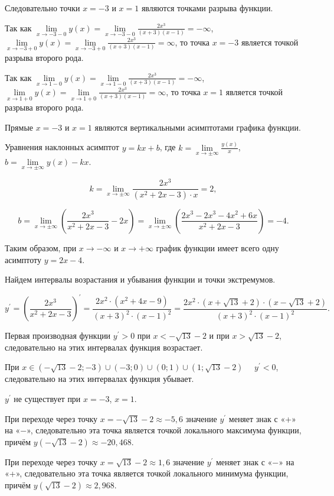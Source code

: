 \documentclass[fleqn]{article}
\begin{document}
Следовательно точки $x=-3$ и $x=1$ являются точками разрыва функции.

Так как $\lim\limits_{x\to-3-0}y(x)=\lim\limits_{x\to-3-0}\frac{2x^3}{(x+3)(x-1)}=-\infty$, $\lim\limits_{x\to-3+0}y(x)=\lim\limits_{x\to-3+0}\frac{2x^3}{(x+3)(x-1)}=\infty$, то точка $x=-3$ является точкой разрыва второго рода.

Так как $\lim\limits_{x\to1-0}y(x)=\lim\limits_{x\to1-0}\frac{2x^3}{(x+3)(x-1)}=-\infty$, $\lim\limits_{x\to1+0}y(x)=\lim\limits_{x\to1+0}\frac{2x^3}{(x+3)(x-1)}=\infty$, то точка $x=1$ является точкой разрыва второго рода.

Прямые $x=-3$ и $x=1$ являются вертикальными асимптотами графика функции.

Уравнения наклонных асимптот $y=kx+b$, где $k=\lim\limits_{x\to\pm\infty}\frac{y(x)}{x}$, $b=\lim\limits_{x\to\pm\infty}y(x)-kx$.

$$k=\lim\limits_{x\to\pm\infty}\frac{2x^3}{(x^2+2x-3)\cdot x}=2,$$

$$b=\lim\limits_{x\to\pm\infty}\left(\frac{2x^3}{x^2+2x-3}-2x\right)=\lim\limits_{x\to\pm\infty}\left(\frac{2x^3-2x^3-4x^2+6x}{x^2+2x-3}\right)=-4.$$

Таким образом, при $x\to-\infty$ и $x\to+\infty$ график функции имеет всего одну асимптоту $y=2x-4$.

Найдем интервалы возрастания и убывания функции и точки экстремумов.

$$y^\prime=\left(\frac{2x^3}{x^2+2x-3}\right)^\prime=\frac{2x^2\cdot(x^2+4x-9)}{(x+3)^2\cdot(x-1)^2}=\frac{2x^2\cdot(x+\sqrt{13}+2)\cdot(x-\sqrt{13}+2)}{(x+3)^2\cdot(x-1)^2}.$$

Первая производная функции $y^\prime>0$ при $x<-\sqrt{13}-2$ и при $x>\sqrt{13}-2$, следовательно на этих интервалах функция возрастает.

При $x\in\left(-\sqrt{13}-2;-3\right)\cup\left(-3;0\right)\cup\left(0;1\right)\cup\left(1;\sqrt{13}-2\right)\quad$ $y^\prime<0$, следовательно на этих интервалах функция убывает.

$y^\prime$ не существует при $x=-3$, $x=1$.

При переходе через точку $x=-\sqrt{13}-2\approx-5,6$ значение $y^\prime$ меняет знак с «+» на «$-$», следовательно эта точка является точкой локального максимума функции, причём $y(-\sqrt{13}-2)\approx-20,468$.

При переходе через точку $x=\sqrt{13}-2\approx1,6$ значение $y^\prime$ меняет знак с «$-$» на «+», следовательно эта точка является точкой локального минимума функции, причём $y(\sqrt{13}-2)\approx2,968$.
\end{document}

